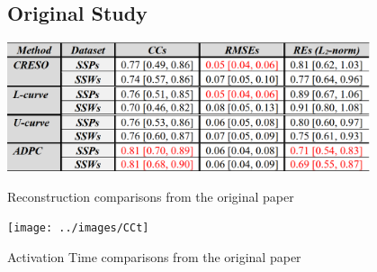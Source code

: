 \documentclass[draftcls, onecolumn, journal]{IEEEtran}
\begin{document}
\subsection{Original Study}

\begin{table}[h]
\centering
\includegraphics[width=0.8\textwidth]{../images/RecTable.png}
\caption{\label{tab:tabname}Reconstruction comparisons from the original paper}
\end{table}

\begin{table}[h]
    \centering
    \texttt{[image: ../images/CCt]}
    \caption{\label{tab:tabname}Activation Time comparisons from the original paper}
\end{table}



\newpage
\printbibliography
\end{document}
